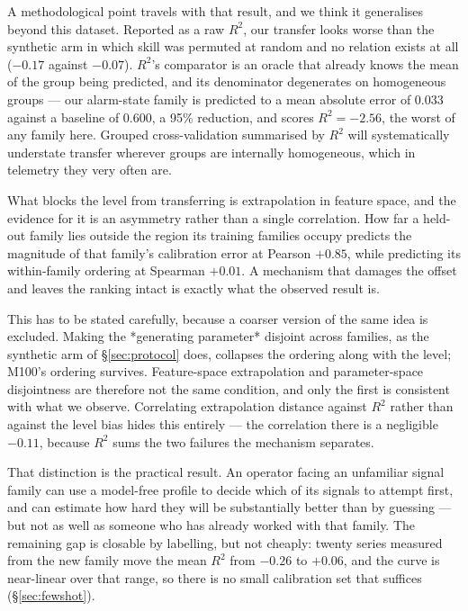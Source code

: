 \documentclass[11pt,a4paper]{article}
\newcommand{\num}[1]{#1}
\begin{document}
A methodological point travels with that result, and we think it generalises
beyond this dataset. Reported as a raw \(R^2\), our transfer looks worse than
the synthetic arm in which skill was permuted at random and no relation exists
at all (\(-0.17\) against \(-0.07\)). \(R^2\)'s comparator is an oracle that
already knows the mean of the group being predicted, and its denominator
degenerates on homogeneous groups --- our alarm-state family is predicted to a
mean absolute error of \num{0.033} against a baseline of \num{0.600}, a
\num{95}\% reduction, and scores \(R^2=-2.56\), the worst of any family here. Grouped cross-validation summarised by \(R^2\) will
systematically understate transfer wherever groups are internally homogeneous,
which in telemetry they very often are.

What blocks the level from transferring is extrapolation in feature space, and
the evidence for it is an asymmetry rather than a single correlation. How far a
held-out family lies outside the region its training families occupy predicts
the magnitude of that family's calibration error at Pearson \(+0.85\), while
predicting its within-family ordering at Spearman \(+0.01\). A mechanism that
damages the offset and leaves the ranking intact is exactly what the observed
result is.

This has to be stated carefully, because a coarser version of the same idea is
excluded. Making the *generating parameter* disjoint across families, as the
synthetic arm of \S\ref{sec:protocol} does, collapses the ordering along with
the level; M100's ordering survives. Feature-space extrapolation and
parameter-space disjointness are therefore not the same condition, and only the
first is consistent with what we observe. Correlating extrapolation distance
against \(R^2\) rather than against the level bias hides this entirely --- the
correlation there is a negligible \(-0.11\), because \(R^2\) sums the two
failures the mechanism separates.

That distinction is the practical result. An operator facing an unfamiliar
signal family can use a model-free profile to decide which of its signals to
attempt first, and can estimate how hard they will be substantially better than
by guessing --- but not as well as someone who has already worked with that
family. The remaining gap is closable by labelling, but not cheaply: twenty
series measured from the new family move the mean \(R^2\) from \(-0.26\) to
\(+0.06\), and the curve is near-linear over that range, so there is no small
calibration set that suffices (\S\ref{sec:fewshot}).
\end{document}
